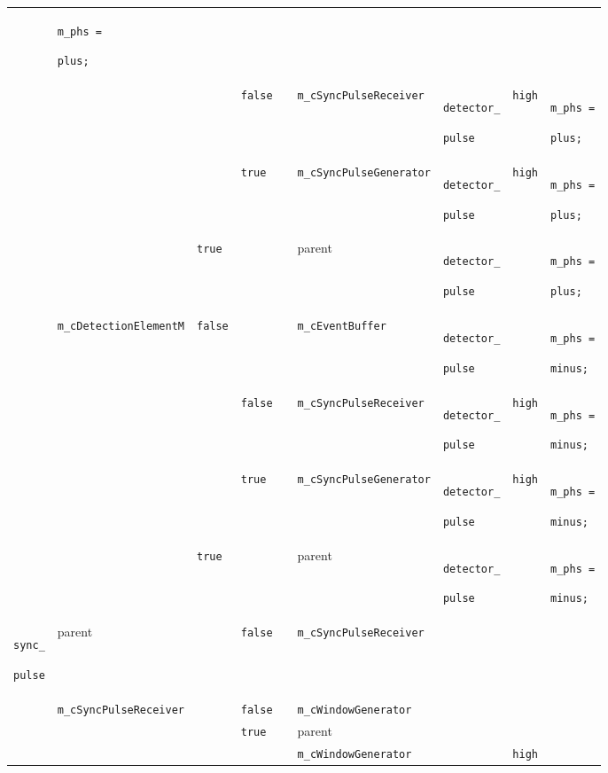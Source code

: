 \begin{footnotesize}
\begin{longtable}[H]{ | m{1.2cm} | m{1.9cm} | m{1.2cm} | l | m{1.5cm} || m{1.8cm} | m{1.4cm} | m{1.2cm} | m{1.7cm} | }
  &
  \texttt{m\_phs =} \par \texttt{plus;} \\
\cline{4-9}
  &
  &
  &
  \texttt{false} &
  &
  \texttt{m\_cSyncPulseReceiver} &
  \texttt{detector\_} \par \texttt{pulse} &
  \texttt{high} &
  \texttt{m\_phs =} \par \texttt{plus;} \\
\cline{4-9}
  &
  &
  &
  \texttt{true} &
  &
  \texttt{m\_cSyncPulseGenerator} &
  \texttt{detector\_} \par \texttt{pulse} &
  \texttt{high} &
  \texttt{m\_phs =} \par \texttt{plus;} \\
\cline{3-9}
  &
  &
  \texttt{true} &
  &
  &
  parent &
  \texttt{detector\_} \par \texttt{pulse} &
  &
  \texttt{m\_phs =} \par \texttt{plus;} \\
\cline{2-9}
  &
  \texttt{m\_cDetectionElementM} &
  \texttt{false} &
  &
  &
  \texttt{m\_cEventBuffer} &
  \texttt{detector\_} \par \texttt{pulse} &
  &
  \texttt{m\_phs =} \par \texttt{minus;} \\
\cline{4-9}
  &
  &
  &
  \texttt{false} &
  &
  \texttt{m\_cSyncPulseReceiver} &
  \texttt{detector\_} \par \texttt{pulse} &
  \texttt{high} &
  \texttt{m\_phs =} \par \texttt{minus;} \\
\cline{4-9}
  &
  &
  &
  \texttt{true} &
  &
  \texttt{m\_cSyncPulseGenerator} &
  \texttt{detector\_} \par \texttt{pulse} &
  \texttt{high} &
  \texttt{m\_phs =} \par \texttt{minus;} \\
\cline{3-9}
  &
  &
  \texttt{true} &
  &
  &
  parent &
  \texttt{detector\_} \par \texttt{pulse} &
  &
  \texttt{m\_phs =} \par \texttt{minus;} \\
  
\hline

  \texttt{sync\_} \par \texttt{pulse} &
  parent &
  &
  \texttt{false} &
  &
  \texttt{m\_cSyncPulseReceiver} &
  &
  &
  \\
\cline{2-9}
  &
  \texttt{m\_cSyncPulseReceiver} &
  &
  \texttt{false} &
  &
  \texttt{m\_cWindowGenerator} &
  &
  &
  \\
\cline{2-9}
  &
  &
  &
  \texttt{true} &
  &
  parent &
  &
  &
  \\
\cline{6-9}
  &
  &
  &
  &
  &
  \texttt{m\_cWindowGenerator} &
  &
  \texttt{high} &
  \\
  

\end{longtable}
\end{footnotesize}
